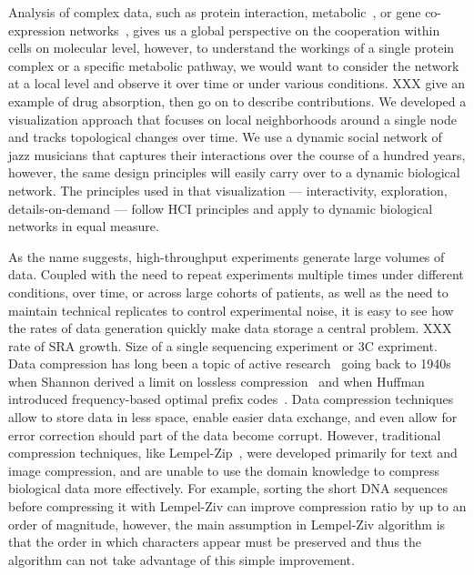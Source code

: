 
Analysis of complex data, such as protein interaction, metabolic~\cite{metabolic}, or gene co-expression networks~\cite{Stuart2003}, gives us a global perspective on the cooperation within cells on molecular level, however, to understand the workings of a single protein complex or a specific metabolic pathway, we would want to consider the network at a local level and observe it over time or under various conditions. 
XXX give an example of drug absorption, then go on to describe contributions. 
We developed a visualization approach that focuses on local neighborhoods around a single node and tracks topological changes over time. We use a dynamic social network of jazz musicians that captures their interactions over the course of a hundred years, however, the same design principles will easily carry over to a dynamic biological network. The principles used in that visualization --- interactivity, exploration, details-on-demand --- follow HCI principles and apply to dynamic biological networks in equal measure.


As the name suggests, high-throughput experiments generate large volumes of  data. Coupled with the need to repeat experiments multiple times under different conditions, over time, or across large cohorts of patients, as well as the need to maintain technical replicates to control experimental noise, it is easy to see how the rates of data generation quickly make data storage a central problem. XXX rate of SRA growth. Size of a single sequencing experiment or 3C expriment. Data compression has long been a topic of active research~\cite{Deorowicz2013b} going back to 1940s when Shannon derived a limit on lossless compression~\cite{Shannon1948} and when Huffman introduced frequency-based optimal prefix codes~\cite{Huffman1952}. Data compression techniques allow to store data in less space, enable easier data exchange, and even allow for error correction should part of the data become corrupt. However, traditional compression techniques, like Lempel-Zip~\cite{LempelZiv77}, were developed primarily for text and image compression, and are unable to use the domain knowledge to compress biological data more effectively. For example, sorting the short DNA sequences before compressing it with Lempel-Ziv can improve compression ratio by up to an order of magnitude, however, the main assumption in Lempel-Ziv algorithm is that the order in which characters appear must be preserved and thus the algorithm can not take advantage of this simple improvement. 

